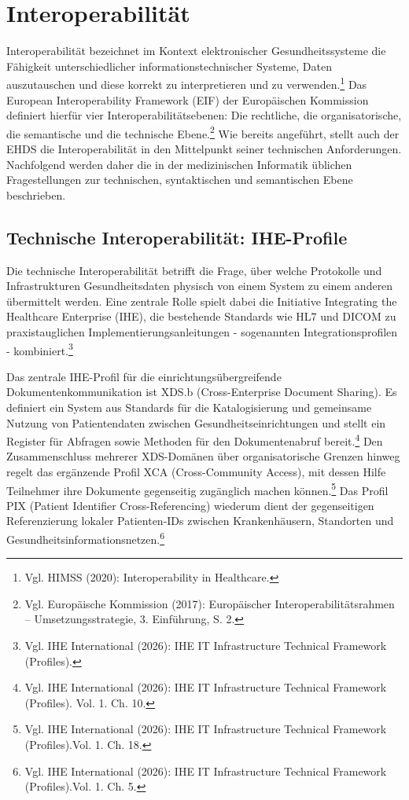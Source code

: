 \section{Interoperabilität}
Interoperabilität bezeichnet im Kontext elektronischer Gesundheitssysteme die Fähigkeit unterschiedlicher informationstechnischer Systeme, Daten auszutauschen und diese korrekt zu interpretieren und zu verwenden.\footnote{Vgl. HIMSS (2020): Interoperability in Healthcare.} Das European Interoperability Framework (EIF) der Europäischen Kommission definiert hierfür vier Interoperabilitätsebenen: Die rechtliche, die organisatorische, die semantische und die technische Ebene.\footnote{Vgl. Europäische Kommission (2017): Europäischer Interoperabilitätsrahmen – Umsetzungsstrategie, 3. Einführung, S. 2.} Wie bereits angeführt, stellt auch der EHDS die Interoperabilität in den Mittelpunkt seiner technischen Anforderungen. Nachfolgend werden daher die in der medizinischen Informatik üblichen Fragestellungen zur technischen, syntaktischen und semantischen Ebene beschrieben.

    \subsection{Technische Interoperabilität: IHE-Profile}
Die technische Interoperabilität betrifft die Frage, über welche Protokolle und Infrastrukturen Gesundheitsdaten physisch von einem System zu einem anderen übermittelt werden. Eine zentrale Rolle spielt dabei die Initiative Integrating the Healthcare Enterprise (IHE), die bestehende Standards wie HL7 und DICOM zu praxistauglichen Implementierungsanleitungen - sogenannten Integrationsprofilen - kombiniert.\footnote{Vgl. IHE International (2026): IHE IT Infrastructure Technical Framework (Profiles).}

Das zentrale IHE-Profil für die einrichtungsübergreifende Dokumentenkommunikation ist XDS.b (Cross-Enterprise Document Sharing). Es definiert ein System aus Standards für die Katalogisierung und gemeinsame Nutzung von Patientendaten zwischen Gesundheitseinrichtungen und stellt ein Register für Abfragen sowie Methoden für den Dokumentenabruf bereit.\footnote{Vgl. IHE International (2026): IHE IT Infrastructure Technical Framework (Profiles). Vol. 1. Ch. 10.}
Den Zusammenschluss mehrerer XDS-Domänen über organisatorische Grenzen hinweg regelt das ergänzende Profil XCA (Cross-Community Access), mit dessen Hilfe Teilnehmer ihre Dokumente gegenseitig zugänglich machen können.\footnote{Vgl. IHE International (2026): IHE IT Infrastructure Technical Framework (Profiles).Vol. 1. Ch. 18.} Das Profil PIX (Patient Identifier Cross-Referencing) wiederum dient der gegenseitigen Referenzierung lokaler Patienten-IDs zwischen Krankenhäusern, Standorten und Gesundheitsinformationsnetzen.\footnote{Vgl. IHE International (2026): IHE IT Infrastructure Technical Framework (Profiles).Vol. 1. Ch. 5.}

